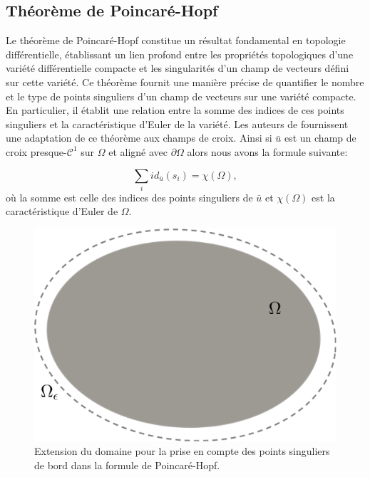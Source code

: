 \subsection{Théorème de Poincaré-Hopf}
\label{subsec:Poincare_Hopf}

Le théorème de Poincaré-Hopf constitue un résultat fondamental en topologie différentielle, établissant un lien profond entre les propriétés topologiques d'une variété différentielle compacte et les singularités d'un champ de vecteurs défini sur cette variété. Ce théorème fournit une manière précise de quantifier le nombre et le type de points singuliers d'un champ de vecteurs sur une variété compacte. En particulier, il établit une relation entre la somme des indices de ces points singuliers et la caractéristique d'Euler de la variété. Les auteurs de \cite{ray2008n} fournissent une adaptation de ce théorème aux champs de croix. Ainsi si $\bar{u}$ est un champ de croix presque-$\mathcal{C}^1$ sur $\Omega$ et aligné avec $\partial\Omega$ alors nous avons la formule suivante:

\begin{equation}
    \label{eqn:first_Poincare_Hopf}
    \sum_i id_{\bar{u}}(s_i)=\chi(\Omega),
\end{equation}
où la somme est celle des indices des points singuliers de $\bar{u}$ et $\chi(\Omega)$ est la caractéristique d'Euler de $\Omega$.

\begin{figure}[!h]
  \centering
  \includegraphics[scale=0.35]{images/Poincare_etendu.pdf}
  \caption{Extension du domaine pour la prise en compte des points singuliers de bord dans la formule de Poincaré-Hopf.}
  \label{fig:Poincare_etendu}
\end{figure}

